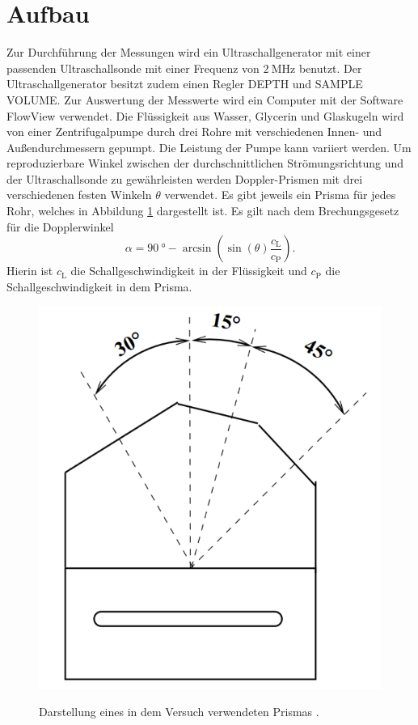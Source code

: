 \section{Aufbau}
\label{sec:Aufbau}
Zur Durchführung der Messungen wird ein Ultraschallgenerator mit einer passenden Ultraschallsonde mit einer Frequenz von $\SI{2}{\mega\hertz}$ benutzt. Der Ultraschallgenerator besitzt zudem einen Regler DEPTH und SAMPLE VOLUME. Zur Auswertung der Messwerte wird ein Computer mit der Software FlowView verwendet. Die Flüssigkeit aus Wasser, Glycerin und Glaskugeln wird von einer Zentrifugalpumpe durch drei Rohre mit verschiedenen Innen- und Außendurchmessern gepumpt. Die Leistung der Pumpe kann variiert werden. Um reproduzierbare Winkel zwischen der durchschnittlichen Strömungsrichtung und der Ultraschallsonde zu gewährleisten werden Doppler-Prismen mit drei verschiedenen festen Winkeln $\theta$ verwendet. Es gibt jeweils ein Prisma für jedes Rohr, welches in Abbildung \ref{fig:prisma} dargestellt ist. Es gilt nach dem Brechungsgesetz für die Dopplerwinkel 
\begin{equation}
	\alpha = \SI{90}{\degree} - \arcsin\left(\sin(\theta) \frac{c_\text{L}}{c_\text{P}}\right)\text{.}
\end{equation}
Hierin ist $c_\text{L}$ die Schallgeschwindigkeit in der Flüssigkeit und $c_\text{P}$ die Schallgeschwindigkeit in dem Prisma.
\begin{figure}
	\centering
	\caption{Darstellung eines in dem Versuch verwendeten Prismas \cite{US3}.}
	\includegraphics[width=\linewidth-70pt,height=0.3\textheight,keepaspectratio]{content/images/prisma.png}
	\label{fig:prisma}
\end{figure}
